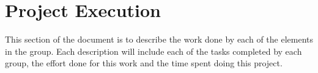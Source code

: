 \newpage

\section{Project Execution}

\quad This section of the document is to describe the work done by each of the elements in the group. Each description will include each of the tasks completed by each group, the effort done for this work and the time spent doing this project.





